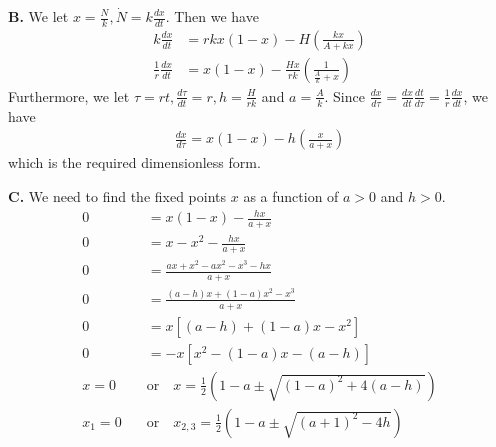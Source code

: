 \documentclass[]{article}
\begin{document}
	\textbf{B.} We let $x=\frac{N}{k}, \dot{N}=k\frac{dx}{dt}$. Then we have
	\begin{align*}
	k \frac{dx}{dt} &= rkx(1-x)-H \left(\frac{kx}{A+kx}\right)\\
	\frac{1}{r}\frac{dx}{dt}&=x(1-x)-\frac{Hx}{rk}\left(\frac{1}{\frac{A}{k}+x}\right)
	\end{align*}
	Furthermore, we let $\tau=rt, \frac{d\tau}{dt}=r, h=\frac{H}{rk}$ and $a=\frac{A}{k}$. Since $\frac{dx}{d\tau}=\frac{dx}{dt}\frac{dt}{d\tau}=\frac{1}{r}\frac{dx}{dt}$, we have
	\begin{align*}
	\frac{dx}{d\tau}=x(1-x)-h\left(\frac{x}{a+x}\right)
	\end{align*}
	which is the required dimensionless form.
	
	\textbf{C.} We need to find the fixed points $x$ as a function of $a>0$ and $h>0$.
	\begin{align*}
	0 &= x(1-x) - \frac{hx}{a+x}\\
	0 &= x - x^2 - \frac{hx}{a+x}\\
	0 &= \frac{ax + x^2 -ax^2 -x^3 -hx}{a+x}\\
	0 &= \frac{(a-h)x + (1-a)x^2 - x^3}{a+x}\\
	0 &= x \left[(a-h) + (1-a)x - x^2\right]\\
	0 &= -x \left[x^2 - (1-a)x - (a-h)\right]\\
	x = 0 \quad &\text{or} \quad x = \frac{1}{2}\left(1-a \pm \sqrt{(1-a)^2+4(a-h)}\right)\\
	x_1 = 0 \quad &\text{or} \quad x_{2,3} = \frac{1}{2}\left(1-a \pm \sqrt{(a+1)^2-4h}\right)
	\end{align*}
	
\end{document}

